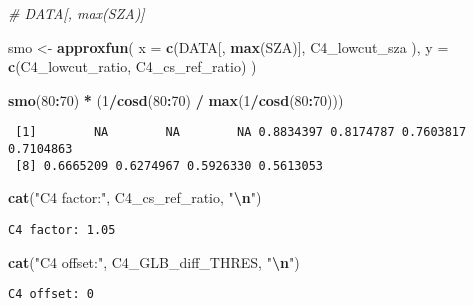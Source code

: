 \documentclass[
  10pt,
  a4paper,oneside]{article}
\newenvironment{Shaded}{\begin{snugshade}}{\end{snugshade}}
\newcommand{\AttributeTok}[1]{\textcolor[rgb]{0.13,0.29,0.53}{#1}}
\newcommand{\CommentTok}[1]{\textcolor[rgb]{0.56,0.35,0.01}{\textit{#1}}}
\newcommand{\DecValTok}[1]{\textcolor[rgb]{0.00,0.00,0.81}{#1}}
\newcommand{\FunctionTok}[1]{\textcolor[rgb]{0.13,0.29,0.53}{\textbf{#1}}}
\newcommand{\NormalTok}[1]{#1}
\newcommand{\OtherTok}[1]{\textcolor[rgb]{0.56,0.35,0.01}{#1}}
\newcommand{\SpecialCharTok}[1]{\textcolor[rgb]{0.81,0.36,0.00}{\textbf{#1}}}
\newcommand{\StringTok}[1]{\textcolor[rgb]{0.31,0.60,0.02}{#1}}
\begin{document}
\begin{Shaded}
\begin{Highlighting}[]
\CommentTok{\# DATA[, max(SZA)]}

\NormalTok{smo }\OtherTok{\textless{}{-}} \FunctionTok{approxfun}\NormalTok{(}
    \AttributeTok{x =} \FunctionTok{c}\NormalTok{(DATA[, }\FunctionTok{max}\NormalTok{(SZA)], C4\_lowcut\_sza  ),}
    \AttributeTok{y =} \FunctionTok{c}\NormalTok{(C4\_lowcut\_ratio,  C4\_cs\_ref\_ratio)}
\NormalTok{    )}

\FunctionTok{smo}\NormalTok{(}\DecValTok{80}\SpecialCharTok{:}\DecValTok{70}\NormalTok{) }\SpecialCharTok{*}\NormalTok{ (}\DecValTok{1}\SpecialCharTok{/}\FunctionTok{cosd}\NormalTok{(}\DecValTok{80}\SpecialCharTok{:}\DecValTok{70}\NormalTok{) }\SpecialCharTok{/} \FunctionTok{max}\NormalTok{(}\DecValTok{1}\SpecialCharTok{/}\FunctionTok{cosd}\NormalTok{(}\DecValTok{80}\SpecialCharTok{:}\DecValTok{70}\NormalTok{)))}
\end{Highlighting}
\end{Shaded}

\begin{verbatim}
 [1]        NA        NA        NA 0.8834397 0.8174787 0.7603817 0.7104863
 [8] 0.6665209 0.6274967 0.5926330 0.5613053
\end{verbatim}

\begin{Shaded}
\begin{Highlighting}[]
\FunctionTok{cat}\NormalTok{(}\StringTok{"C4 factor:"}\NormalTok{, C4\_cs\_ref\_ratio,   }\StringTok{"}\SpecialCharTok{\textbackslash{}n}\StringTok{"}\NormalTok{)}
\end{Highlighting}
\end{Shaded}

\begin{verbatim}
C4 factor: 1.05 
\end{verbatim}

\begin{Shaded}
\begin{Highlighting}[]
\FunctionTok{cat}\NormalTok{(}\StringTok{"C4 offset:"}\NormalTok{, C4\_GLB\_diff\_THRES, }\StringTok{"}\SpecialCharTok{\textbackslash{}n}\StringTok{"}\NormalTok{)}
\end{Highlighting}
\end{Shaded}

\begin{verbatim}
C4 offset: 0 
\end{verbatim}
\end{document}
